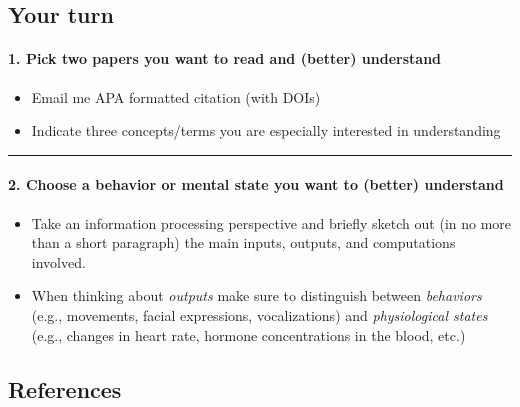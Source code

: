 \documentclass[]{article}
\providecommand{\tightlist}{%
  \setlength{\itemsep}{0pt}\setlength{\parskip}{0pt}}
\let\oldparagraph\paragraph
\renewcommand{\paragraph}[1]{\oldparagraph{#1}\mbox{}}
\begin{document}
\hypertarget{your-turn}{%
\subsection{Your turn}\label{your-turn}}

\hypertarget{pick-two-papers-you-want-to-read-and-better-understand}{%
\paragraph{1. Pick two papers you want to read and (better)
understand}\label{pick-two-papers-you-want-to-read-and-better-understand}}

\begin{itemize}
\tightlist
\item
  Email me APA formatted citation (with DOIs)
\item
  Indicate three concepts/terms you are especially interested in
  understanding
\end{itemize}

\begin{center}\rule{0.5\linewidth}{\linethickness}\end{center}

\hypertarget{choose-a-behavior-or-mental-state-you-want-to-better-understand}{%
\paragraph{2. Choose a behavior or mental state you want to (better)
understand}\label{choose-a-behavior-or-mental-state-you-want-to-better-understand}}

\begin{itemize}
\tightlist
\item
  Take an information processing perspective and briefly sketch out (in
  no more than a short paragraph) the main inputs, outputs, and
  computations involved.
\item
  When thinking about \emph{outputs} make sure to distinguish between
  \emph{behaviors} (e.g., movements, facial expressions, vocalizations)
  and \emph{physiological states} (e.g., changes in heart rate, hormone
  concentrations in the blood, etc.)
\end{itemize}

\hypertarget{references}{%
\subsection*{References}\label{references}}
\end{document}
